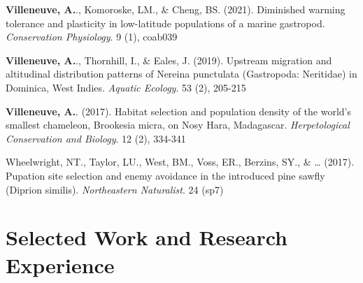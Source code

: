 \documentclass[11pt,a4paper,]{awesome-cv}
\begin{document}
\textbf{Villeneuve, A.}., Komoroske, LM., \& Cheng, BS. (2021).
Diminished warming tolerance and plasticity in low-latitude populations
of a marine gastropod. \emph{Conservation Physiology}. 9 (1), coab039

\textbf{Villeneuve, A.}., Thornhill, I., \& Eales, J. (2019). Upstream
migration and altitudinal distribution patterns of Nereina punctulata
(Gastropoda: Neritidae) in Dominica, West Indies. \emph{Aquatic
Ecology}. 53 (2), 205-215

\textbf{Villeneuve, A.}. (2017). Habitat selection and population
density of the world's smallest chameleon, Brookesia micra, on Nosy
Hara, Madagascar. \emph{Herpetological Conservation and Biology}. 12
(2), 334-341

Wheelwright, NT., Taylor, LU., West, BM., Voss, ER., Berzins, SY., \&
\ldots{} (2017). Pupation site selection and enemy avoidance in the
introduced pine sawfly (Diprion similis). \emph{Northeastern
Naturalist}. 24 (sp7)

\hypertarget{selected-work-and-research-experience}{%
\section{Selected Work and Research
Experience}\label{selected-work-and-research-experience}}
\end{document}
